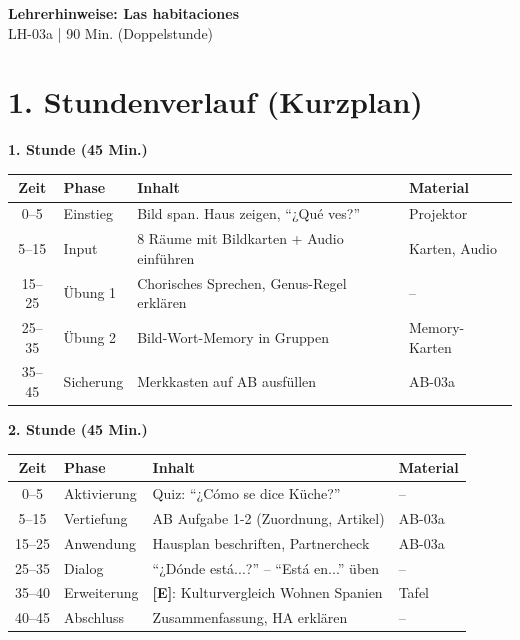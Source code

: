 \documentclass[11pt, a4paper]{article}
\newcommand{\fachfarbe}{spanisch}
\newcommand{\thema}{Las habitaciones}
\newcommand{\sequenz}{03}
\newcommand{\block}{a}
\newcommand{\dauer}{90 Min. (Doppelstunde)}
\newcommand{\E}{\textcolor{erweiterung}{\textbf{[E]}}}
\begin{document}

\begin{center}
    {\Large\bfseries\textcolor{\fachfarbe}{Lehrerhinweise: \thema}}\\[0.3em]
    {\normalsize LH-\sequenz\block{} | \dauer}
\end{center}

\vspace{10pt}


\section*{1. Stundenverlauf (Kurzplan)}

\textbf{1. Stunde (45 Min.)}

\begin{tabularx}{\textwidth}{|c|l|X|l|}
\hline
\textbf{Zeit} & \textbf{Phase} & \textbf{Inhalt} & \textbf{Material} \\
\hline
0--5 & Einstieg & Bild span. Haus zeigen, ``¿Qué ves?'' & Projektor \\
\hline
5--15 & Input & 8 Räume mit Bildkarten + Audio einführen & Karten, Audio \\
\hline
15--25 & Übung 1 & Chorisches Sprechen, Genus-Regel erklären & -- \\
\hline
25--35 & Übung 2 & Bild-Wort-Memory in Gruppen & Memory-Karten \\
\hline
35--45 & Sicherung & Merkkasten auf AB ausfüllen & AB-03a \\
\hline
\end{tabularx}

\vspace{1em}

\textbf{2. Stunde (45 Min.)}

\begin{tabularx}{\textwidth}{|c|l|X|l|}
\hline
\textbf{Zeit} & \textbf{Phase} & \textbf{Inhalt} & \textbf{Material} \\
\hline
0--5 & Aktivierung & Quiz: ``¿Cómo se dice Küche?'' & -- \\
\hline
5--15 & Vertiefung & AB Aufgabe 1-2 (Zuordnung, Artikel) & AB-03a \\
\hline
15--25 & Anwendung & Hausplan beschriften, Partnercheck & AB-03a \\
\hline
25--35 & Dialog & ``¿Dónde está...?'' -- ``Está en...'' üben & -- \\
\hline
35--40 & Erweiterung & \E{}: Kulturvergleich Wohnen Spanien & Tafel \\
\hline
40--45 & Abschluss & Zusammenfassung, HA erklären & -- \\
\hline
\end{tabularx}
\end{document}
